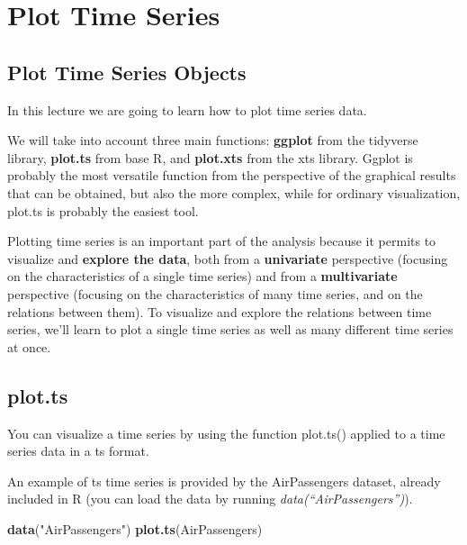 \documentclass[
]{article}
\newenvironment{Shaded}{\begin{snugshade}}{\end{snugshade}}
\newcommand{\KeywordTok}[1]{\textcolor[rgb]{0.13,0.29,0.53}{\textbf{#1}}}
\newcommand{\NormalTok}[1]{#1}
\newcommand{\StringTok}[1]{\textcolor[rgb]{0.31,0.60,0.02}{#1}}
\begin{document}
\hypertarget{plot-time-series}{%
\section{Plot Time Series}\label{plot-time-series}}

\hypertarget{plot-time-series-objects}{%
\subsection{Plot Time Series Objects}\label{plot-time-series-objects}}

In this lecture we are going to learn how to plot time series data.

We will take into account three main functions: \textbf{ggplot} from the tidyverse library, \textbf{plot.ts} from base R, and \textbf{plot.xts} from the xts library. Ggplot is probably the most versatile function from the perspective of the graphical results that can be obtained, but also the more complex, while for ordinary visualization, plot.ts is probably the easiest tool.

Plotting time series is an important part of the analysis because it permits to visualize and \textbf{explore the data}, both from a \textbf{univariate} perspective (focusing on the characteristics of a single time series) and from a \textbf{multivariate} perspective (focusing on the characteristics of many time series, and on the relations between them). To visualize and explore the relations between time series, we'll learn to plot a single time series as well as many different time series at once.

\hypertarget{plot.ts}{%
\subsection{plot.ts}\label{plot.ts}}

You can visualize a time series by using the function plot.ts() applied to a time series data in a ts format.

An example of ts time series is provided by the AirPassengers dataset, already included in R (you can load the data by running \emph{data(``AirPassengers'')}).

\begin{Shaded}
\begin{Highlighting}[]
\KeywordTok{data}\NormalTok{(}\StringTok{"AirPassengers"}\NormalTok{)}
\KeywordTok{plot.ts}\NormalTok{(AirPassengers)}
\end{Highlighting}
\end{Shaded}
\end{document}

